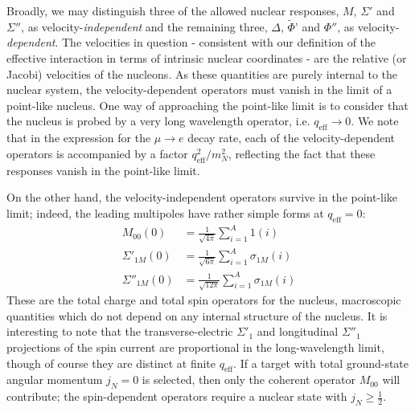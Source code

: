 \documentclass{book}[12pt]
\begin{document}
Broadly, we may distinguish three of the allowed nuclear responses, $M$, $\Sigma'$ and $\Sigma''$, as velocity-\textit{independent} and the remaining three, $\Delta$, $\tilde{\Phi}$' and $\Phi''$, as velocity-\textit{dependent}. The velocities in question - consistent with our definition of the effective interaction in terms of intrinsic nuclear coordinates - are the relative (or Jacobi) velocities of the nucleons. As these quantities are purely internal to the nuclear system, the velocity-dependent operators must vanish in the limit of a point-like nucleus. One way of approaching the point-like limit is to consider that the nucleus is probed by a very long wavelength operator, i.e. $q_\mathrm{eff}\rightarrow 0$. We note that in the expression for the $\mu\rightarrow e$ decay rate, each of the velocity-dependent operators is accompanied by a factor $q_\mathrm{eff}^2/m_N^2$, reflecting the fact that these responses vanish in the point-like limit. 

On the other hand, the velocity-independent operators survive in the point-like limit; indeed, the leading multipoles have rather simple forms at $q_\mathrm{eff}=0$:
\begin{equation}
\begin{split}
M_{00}(0)&=\frac{1}{\sqrt{4\pi}}\sum_{i=1}^A 1(i)\\
\Sigma'_{1M}(0)&=\frac{1}{\sqrt{6\pi}}\sum_{i=1}^A\sigma_{1M}(i)\\
\Sigma''_{1M}(0)&=\frac{1}{\sqrt{12\pi}}\sum_{i=1}^A\sigma_{1M}(i)
\end{split}
\end{equation}
These are the total charge and total spin operators for the nucleus, macroscopic quantities which do not depend on any internal structure of the nucleus. It is interesting to note that the transverse-electric $\Sigma'_1$ and longitudinal $\Sigma''_1$ projections of the spin current are proportional in the long-wavelength limit, though of course they are distinct at finite $q_\mathrm{eff}$. If a target with total ground-state angular momentum $j_N=0$ is selected, then only the coherent operator $M_{00}$ will contribute; the spin-dependent operators require a nuclear state with $j_N\geq \frac{1}{2}$. 
\end{document}
